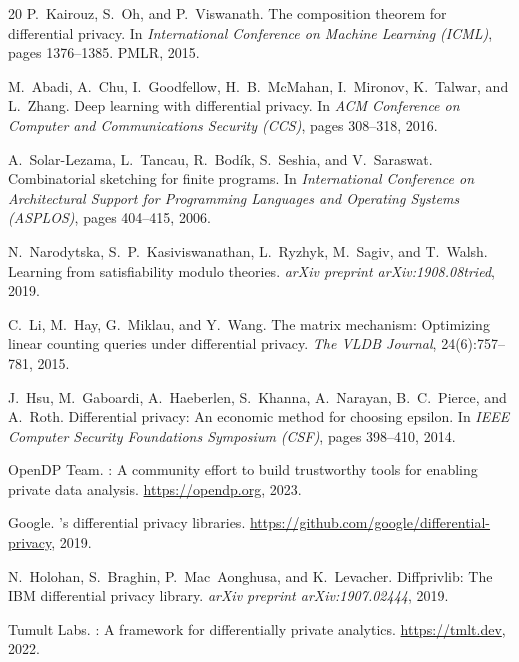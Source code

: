 \documentclass[11pt,a4paper]{article}
\begin{document}
\begin{thebibliography}{20}
P.~Kairouz, S.~Oh, and P.~Viswanath.
\newblock The composition theorem for differential privacy.
\newblock In \emph{International Conference on Machine Learning (ICML)},
  pages 1376--1385. PMLR, 2015.

M.~Abadi, A.~Chu, I.~Goodfellow, H.~B.~McMahan, I.~Mironov, K.~Talwar, and
  L.~Zhang.
\newblock Deep learning with differential privacy.
\newblock In \emph{ACM Conference on Computer and Communications Security (CCS)},
  pages 308--318, 2016.

A.~Solar-Lezama, L.~Tancau, R.~Bod\'ik, S.~Seshia, and V.~Saraswat.
\newblock Combinatorial sketching for finite programs.
\newblock In \emph{International Conference on Architectural Support for
  Programming Languages and Operating Systems (ASPLOS)}, pages 404--415, 2006.

N.~Narodytska, S.~P.~Kasiviswanathan, L.~Ryzhyk, M.~Sagiv, and T.~Walsh.
\newblock Learning from satisfiability modulo theories.
\newblock \emph{arXiv preprint arXiv:1908.08tried}, 2019.

C.~Li, M.~Hay, G.~Miklau, and Y.~Wang.
\newblock The matrix mechanism: Optimizing linear counting queries under
  differential privacy.
\newblock \emph{The VLDB Journal}, 24(6):757--781, 2015.

J.~Hsu, M.~Gaboardi, A.~Haeberlen, S.~Khanna, A.~Narayan, B.~C.~Pierce, and
  A.~Roth.
\newblock Differential privacy: An economic method for choosing epsilon.
\newblock In \emph{IEEE Computer Security Foundations Symposium (CSF)},
  pages 398--410, 2014.

{OpenDP Team}.
: A community effort to build trustworthy tools for enabling
  private data analysis.
\newblock \url{https://opendp.org}, 2023.

{Google}.
's differential privacy libraries.
\newblock \url{https://github.com/google/differential-privacy}, 2019.

N.~Holohan, S.~Braghin, P.~Mac~Aonghusa, and K.~Levacher.
\newblock Diffprivlib: The {IBM} differential privacy library.
\newblock \emph{arXiv preprint arXiv:1907.02444}, 2019.

{Tumult Labs}.
: A framework for differentially private analytics.
\newblock \url{https://tmlt.dev}, 2022.


\end{thebibliography}
\end{document}

